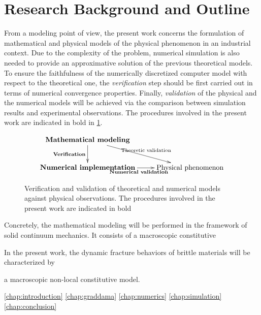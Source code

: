 \section*{Research Background and Outline}
From a modeling point of view, the present work concerns the formulation of mathematical and physical models of the physical phenomenon in an industrial context. Due to the complexity of the problem, numerical simulation is also needed to provide an approximative solution of the previous theoretical models. To ensure the faithfulness of the numerically discretized computer model with respect to the theoretical one, the \emph{verification} step should be first carried out in terms of numerical convergence properties. Finally, \emph{validation} of the physical and the numerical models will be achieved via the comparison between simulation results and experimental observations. The procedures involved in the present work are indicated in bold in \cref{fig:vv}.
\begin{figure}[htbp]
\centering
\[
\xymatrix{
\text{\textbf{Mathematical modeling}} \ar[d]_{\text{\textbf{Verification}}} \ar[rd]^{\text{Theoretic validation}} & \\
\text{\textbf{Numerical implementation}} \ar[r]_{\text{\textbf{Numerical validation}}} & \text{Physical phenomenon}
}
\]
\caption{Verification and validation of theoretical and numerical models against physical observations. The procedures involved in the present work are indicated in bold} \label{fig:vv}
\end{figure}

Concretely, the mathematical modeling will be performed in the framework of solid continuum mechanics. It consists of a macroscopic constitutive 

In the present work, the dynamic fracture behaviors of brittle materials will be characterized by 

a macroscopic non-local constitutive model.




\cref{chap:introduction}
\cref{chap:graddama}
\cref{chap:numerics}
\cref{chap:simulation}
\cref{chap:conclusion}

